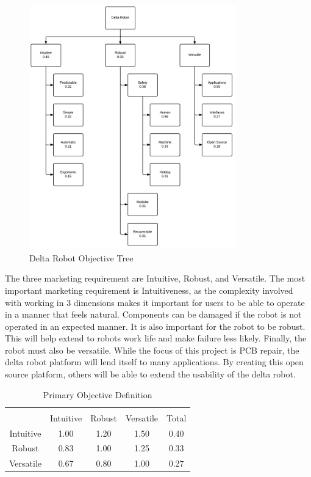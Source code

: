 \documentclass[11pt]{report}
\begin{document}
\begin{figure}[h]
	\centering
	\includegraphics[width=0.8\textwidth]{objectivetree.png}
	\caption{Delta Robot Objective Tree}
	\label{fig:objectivetree}
\end{figure}

The three marketing requirement are Intuitive, Robust, and Versatile.
The most important marketing requirement is Intuitiveness, as the complexity involved with working in 3 dimensions makes it important for users to be able to operate in a manner that feels natural.
Components can be damaged if the robot is not operated in an expected manner.
It is also important for the robot to be robust.
This will help extend to robots work life and make failure less likely.
Finally, the robot must also be versatile.
While the focus of this project is PCB repair, the delta robot platform will lend itself to many applications.
By creating this open source platform, others will be able to extend the usability of the delta robot.

\begin{table}[ht] 
	\caption{Primary Objective Definition}
	\label{table:primary}
	\centering 
	\begin{tabular}{c c c c c} 
		\hline\hline \\
		 			& Intuitive 	& Robust 		& Versatile 	& Total\\ 
		Intuitive 	& 1.00 		& 1.20 		& 1.50 		& 0.40 \\ 
		Robust 		& 0.83 		& 1.00 		& 1.25		& 0.33 \\ 
		Versatile 	& 0.67 		& 0.80 		& 1.00 		& 0.27 \\ 
	\end{tabular} 
\end{table}
\end{document}
